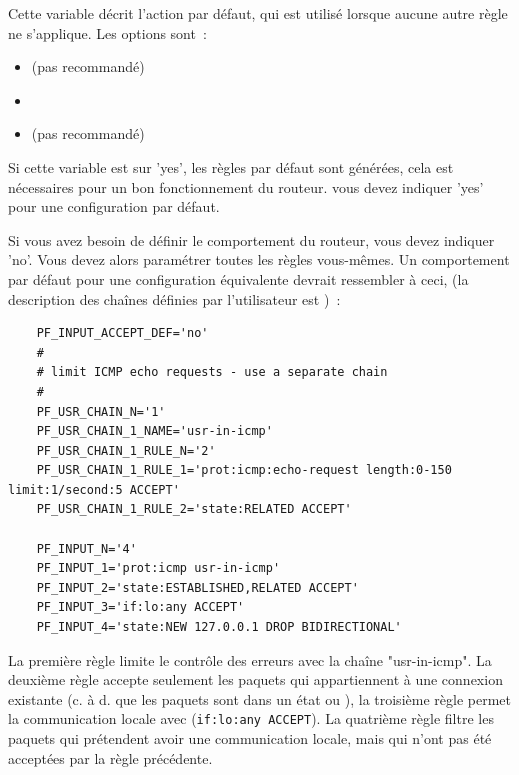 \begin{description}
Cette variable décrit l'action par défaut, qui est utilisé lorsque aucune autre
règle ne s'applique. Les options sont~:

\begin{itemize}
\item {} (pas recommandé)
\item {}
\item {} (pas recommandé)
\end{itemize}

Si cette variable est sur 'yes', les règles par défaut sont générées, cela est
nécessaires pour un bon fonctionnement du routeur. vous devez indiquer 'yes' pour
une configuration par défaut.

Si vous avez besoin de définir le comportement du routeur, vous devez indiquer
'no'. Vous devez alors paramétrer toutes les règles vous-mêmes. Un comportement
par défaut pour une configuration équivalente devrait ressembler à ceci,
(la description des chaînes définies par l'utilisateur est )~:

\begin{example}
{\footnotesize
\begin{verbatim}
    PF_INPUT_ACCEPT_DEF='no'
    #
    # limit ICMP echo requests - use a separate chain
    #
    PF_USR_CHAIN_N='1'
    PF_USR_CHAIN_1_NAME='usr-in-icmp'
    PF_USR_CHAIN_1_RULE_N='2'
    PF_USR_CHAIN_1_RULE_1='prot:icmp:echo-request length:0-150 limit:1/second:5 ACCEPT'
    PF_USR_CHAIN_1_RULE_2='state:RELATED ACCEPT'

    PF_INPUT_N='4'
    PF_INPUT_1='prot:icmp usr-in-icmp'
    PF_INPUT_2='state:ESTABLISHED,RELATED ACCEPT'
    PF_INPUT_3='if:lo:any ACCEPT'
    PF_INPUT_4='state:NEW 127.0.0.1 DROP BIDIRECTIONAL'
\end{verbatim}}
\end{example}

La première règle limite le contrôle des erreurs avec la chaîne "usr-in-icmp".
La deuxième règle accepte seulement les paquets qui appartiennent à une connexion
existante (c. à d. que les paquets sont dans un état 
ou ), la troisième règle permet la communication locale
avec (\verb+if:lo:any ACCEPT+). La quatrième règle filtre les paquets qui
prétendent avoir une communication locale, mais qui n'ont pas été acceptées
par la règle précédente.


\end{description}
